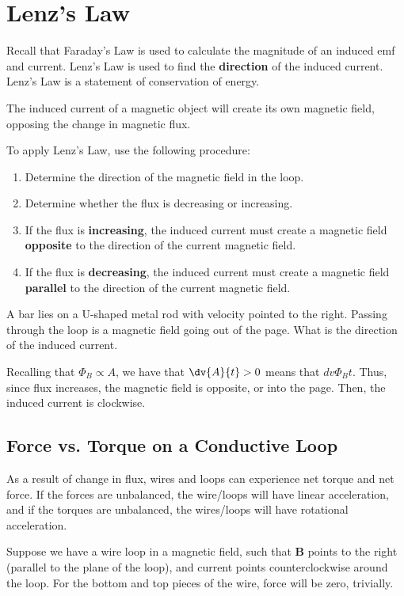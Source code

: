 \documentclass[11pt]{article}
\begin{document}
\section{Lenz's Law}
Recall that Faraday's Law is used to calculate the magnitude of an induced emf and current. Lenz's Law is used to find the \textbf{direction} of the induced current. Lenz's Law is a statement of conservation of energy.
\begin{thrm}
    The induced current of a magnetic object will create its own magnetic field, opposing the change in magnetic flux.
\end{thrm}
To apply Lenz's Law, use the following procedure:
\begin{enumerate}[noitemsep]
    \item Determine the direction of the magnetic field in the loop.
    \item Determine whether the flux is decreasing or increasing.
    \item If the flux is \textbf{increasing}, the induced current must create a magnetic field \textbf{opposite} to the direction of the current magnetic field.
    \item If the flux is \textbf{decreasing}, the induced current must create a magnetic field \textbf{parallel} to the direction of the current magnetic field.
\end{enumerate}
\begin{example}
    A bar lies on a U-shaped metal rod with velocity pointed to the right. Passing through the loop is a magnetic field going out of the page. What is the direction of the induced current.
\end{example}
\begin{solution}
    Recalling that $\Phi_B \propto A$, we have that $\dv{A}{t} > 0$ means that $dv{\Phi_B}{t}$. Thus, since flux increases, the magnetic field is opposite, or into the page. Then, the induced current is clockwise.    
\end{solution}

\subsection{Force vs. Torque on a Conductive Loop}
As a result of change in flux, wires and loops can experience net torque and net force. If the forces are unbalanced, the wire/loops will have linear acceleration, and if the torques are unbalanced, the wires/loops will have rotational acceleration.

Suppose we have a wire loop in a magnetic field, such that $\mathbf{B}$ points to the right (parallel to the plane of the loop), and current points counterclockwise around the loop. For the bottom and top pieces of the wire, force will be zero, trivially.
\end{document}
